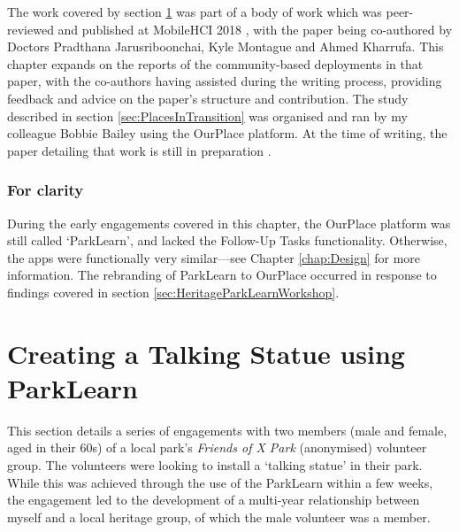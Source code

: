 The work covered by section \ref{sec:TalkingStatue} was part of a body of work which was peer-reviewed and published at MobileHCI 2018 \citep{Richardson2018}, with the paper being co-authored by Doctors Pradthana Jarusriboonchai, Kyle Montague and Ahmed Kharrufa. This chapter expands on the reports of the community-based deployments in that paper, with the co-authors having assisted during the writing process, providing feedback and advice on the paper's structure and contribution. The study described in section \ref{sec:PlacesInTransition} was organised and ran by my colleague Bobbie Bailey using the OurPlace platform. At the time of writing, the paper detailing that work is still in preparation \citep{Bailey2020}. 

\subsubsection{For clarity}
During the early engagements covered in this chapter, the OurPlace platform was still called `ParkLearn', and lacked the Follow-Up Tasks functionality. Otherwise, the apps were functionally very similar---see Chapter \ref{chap:Design} for more information. The rebranding of ParkLearn to OurPlace occurred in response to findings covered in section \ref{sec:HeritageParkLearnWorkshop}.

\section{Creating a Talking Statue using ParkLearn}
\label{sec:TalkingStatue}

This section details a series of engagements with two members (male and female, aged in their 60s) of a local park's \textit{Friends of X Park} (anonymised) volunteer group. The volunteers were looking to install a `talking statue' in their park. While this was achieved through the use of the ParkLearn within a few weeks, the engagement led to the development of a multi-year relationship between myself and a local heritage group, of which the male volunteer was a member. 

